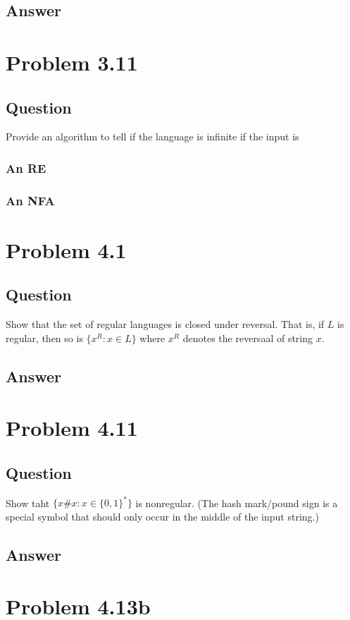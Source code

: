 \documentclass[12pt, a4paper]{article}
\begin{document}
\subsection{Answer}

\section{Problem 3.11}
\subsection{Question}
Provide an algorithm to tell if the language is infinite if the input is
\subsubsection{An RE}
\subsubsection{An NFA}

\section{Problem 4.1}
\subsection{Question}
Show that the set of regular languages is closed under reversal. That is, if $L$ is regular, then so is $\{x^{R} : x \in L\}$ where $x^{R}$ denotes the reversaal of string $x$.
\subsection{Answer}

\section{Problem 4.11}
\subsection{Question}
Show taht $\{x\#x : x \in \{0,1\}^{*}\}$ is nonregular. (The hash mark/pound sign is a special symbol that should only occur in the middle of the input string.)
\subsection{Answer}

\section{Problem 4.13b}
\end{document}

